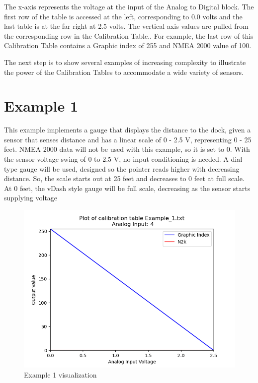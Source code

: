 \documentclass[12pt, letterpaper, twoside, titlepage]{article}
\begin{document}

The x-axis represents the voltage at the input of the Analog to Digital block. The first row of the table is accessed at the left, corresponding to 0.0 volts and the last table is at the far right at 2.5 volts.  The vertical axis values are pulled from the corresponding row in the Calibration Table.. For example, the last row of this Calibration  Table contains a Graphic index of 255 and NMEA 2000 value of 100.
  
The next step is to show several examples of increasing complexity to illustrate the power of the Calibration Tables to accommodate a wide variety of sensors.

\section{Example 1}
This example implements a gauge that displays the distance to the dock, given a sensor that  senses distance and has a linear scale of 0 - 2.5 V, representing 0 - 25 feet.   NMEA 2000 data will not be used with this example, so it is set to 0.  With the sensor voltage swing of 0 to 2.5 V, no input conditioning is needed. A dial type gauge will be used, designed so the pointer reads higher with decreasing distance. So, the scale starts out at 25 feet and decreases to 0 feet at full scale.
At 0 feet, the vDash style gauge will be full scale, decreasing as the sensor starts supplying voltage

\begin{figure}[hbt!]
  \includegraphics[width=\linewidth]{Example_1.txt.png}
  \centering
  \caption{Example 1 visualization}
  \label{fig:Example_1}
\end{figure}
\end{document}
